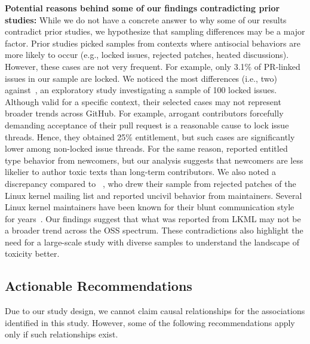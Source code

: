 \vspace{3pt}
\noindent \textbf{Potential reasons behind some of our findings contradicting prior studies:}
While we do not have a concrete answer to why some of our results contradict prior studies, we hypothesize that sampling differences may be a major factor. Prior studies picked samples from contexts where antisocial behaviors are more likely to occur (e.g., locked issues, rejected patches, heated discussions). However, these cases are not very frequent. For example, only 3.1\% of PR-linked issues in our sample are locked.
We noticed the most differences (i.e., two) against~\citet{miller2022did}, an exploratory study investigating a sample of 100 locked issues. Although valid for a specific context, their {selected} cases may not represent broader trends across GitHub. For example, arrogant contributors forcefully demanding acceptance of their pull request is a reasonable cause to lock issue threads. Hence, they obtained 25\% entitlement, but such cases are significantly lower among non-locked issue threads. For the same reason, \citet{miller2022did} reported {entitled type} behavior from newcomers, but our analysis suggests that newcomers are less likelier to author toxic texts than long-term contributors.
We also noted a discrepancy compared to ~\citet{ferreira2021shut}, who drew their sample from rejected patches of the Linux kernel mailing list and reported uncivil behavior from maintainers. Several Linux kernel maintainers have been known for their blunt communication style for years~\cite{toxic-blog-linux1,toxic-blog-linux3}. Our findings suggest that what was reported from LKML may not be a broader trend across the OSS spectrum. These contradictions also highlight the need for a large-scale study with diverse samples to understand the landscape of toxicity better.






\subsection{Actionable Recommendations}
Due to our study design, we cannot claim causal relationships for the associations identified in this study. However, some of the following recommendations apply only if such relationships exist.


